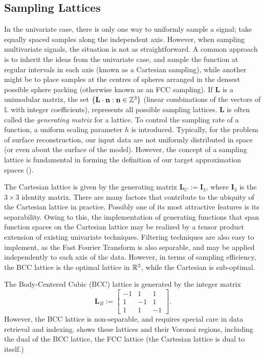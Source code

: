 \subsection{Sampling Lattices} \label{sec:smpl_review}
In the univariate case, there is only one way to uniformly sample a signal; take equally spaced samples along the independent axis. However, when sampling multivariate signals, the situation is not as straightforward. A common approach is to inherit the ideas from the univariate case, and sample the function at regular intervals in each axis (known as a Cartesian sampling), while another might be to place samples at the centres of spheres arranged in the densest possible sphere packing (otherwise known as an FCC sampling). If $\mathbf{L}$ is a unimodular matrix, the set $\{\mathbf{L}\cdot\mathbf{n} : \mathbf{n} \in \mathbb{Z}^3 \}$ (linear combinations of the vectors of $\mathbb{L}$ with integer coefficients), represents all possible sampling lattices. $\mathbf{L}$ is often called the \emph{generating matrix} for a lattice. To control the sampling rate of a function, a uniform scaling parameter $h$ is introduced. Typically, for the problem of surface reconstruction, our input data are not uniformly distributed in space (or even about the surface of the model). However, the concept of a sampling lattice is fundamental in forming the definition of our target approximation spaces ().

The Cartesian lattice is given by the generating matrix $\mathbf{L}_C:=\mathbf{I}_3$, where $\mathbf{I}_3$ is the $3 \times 3$ identity matrix. There are many factors that contribute to the ubiquity of the Cartesian lattice in practice. Possibly one of its most attractive features is its separability. Owing to this, the implementation of generating functions that span function spaces on the Cartesian lattice may be realized by a tensor product extension of existing univariate techniques. Filtering techniques are also easy to implement, as the Fast Fourier Transform is also separable, and may be applied independently to each axis of the data. However, in terms of sampling efficiency, the BCC lattice is the optimal lattice in $\mathbb{R}^3$, while the Cartesian is sub-optimal.

The Body-Centered Cubic (BCC) lattice is generated by the integer matrix  {\footnotesize
\begin{equation*} 
	\mathbf{L}_B := 
	\begin{bmatrix}
		-1 & 1 & 1 \\ 
		1 & -1 & 1 \\ 
		1 & 1 & -1 
	\end{bmatrix}.
\end{equation*}}
However, the BCC lattice is non-separable, and requires special care in data retrieval and indexing.  shows these lattices and their Voronoi regions, including the dual of the BCC lattice, the FCC lattice (the Cartesian lattice is dual to itself.)

